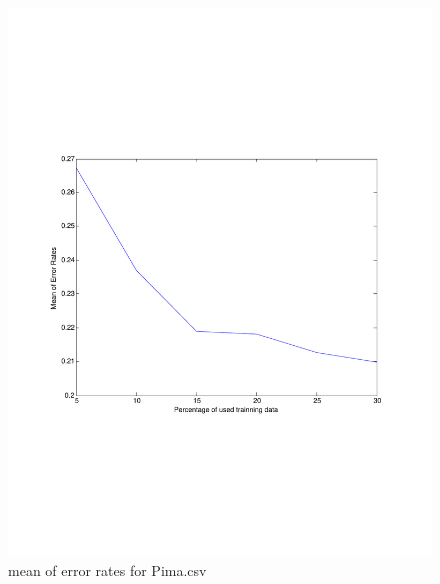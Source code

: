 \documentclass[12pt]{amsart}
\begin{document}
\begin{figure}[H]
\centering
        \includegraphics[totalheight=18cm]{Pima_mean_nbg.pdf}
    \caption{mean of error rates for Pima.csv}
    \label{fig:verticalcell11}
\end{figure}
\end{document}

